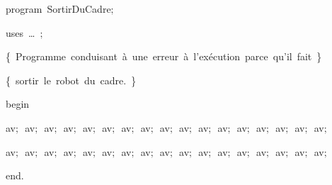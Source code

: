 
{
\parindent {}
\medskip

\carrenoir
\vspace{\neglskip}\mbox{\blc  \idt  \mcl program\idt \ SortirDuCadre$;$
}\par 
\vspace{\neglskip}\mbox{\blc \blk\idt \mcl uses\idt \ \ldots\ $;$
}\par 
\vspace{\neglskip}\mbox{\blc  \blk\idt  \cmt  \{\ Programme\ conduisant\ à\ une\ erreur\ à\ l{'}exécution\ parce\ qu{'}il\ fait\ \}\idt }\par 
\vspace{\neglskip}\mbox{\blc  \blk\idt  \cmt  \{\ sortir\ le\ robot\ du\ cadre.\ \}\idt }\par 
\vspace{\neglskip}\mbox{\blc  \idt  \mcl begin\idt }\par 
\vspace{\neglskip}\mbox{\blc  \blk\idt  av$;$\ av$;$\ av$;$\ av$;$\ av$;$\ av$;$\ av$;$\ av$;$\ av$;$\ av$;$\ av$;$\ av$;$\ av$;$\ av$;$\ av$;$\ av$;$\ av$;$}\par 
\vspace{\neglskip}\mbox{\blc  \blk\idt  av$;$\ av$;$\ av$;$\ av$;$\ av$;$\ av$;$\ av$;$\ av$;$\ av$;$\ av$;$\ av$;$\ av$;$\ av$;$\ av$;$\ av$;$\ av$;$\ av$;$}\par 
\vspace{\neglskip}\mbox{\blc  \idt  \mcl end\idt $.$}\par 

\medskip }

